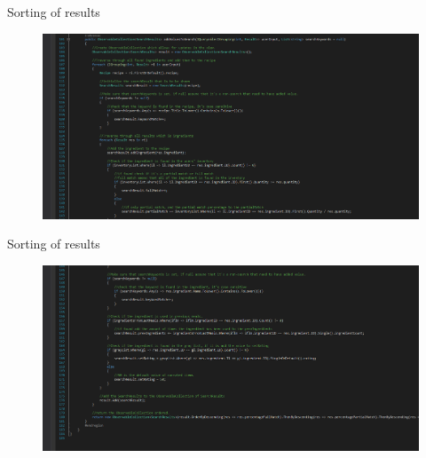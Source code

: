 \begin{frame}{Sorting of results}
    \begin{figure}
        \centering
        \includegraphics[width=\textwidth]{Grafik/sorter1}
    \end{figure}
\end{frame}
\begin{frame}{Sorting of results}
    \begin{figure}
        \centering
        \includegraphics[width=\textwidth]{Grafik/sorter2}
    \end{figure}
\end{frame}




















